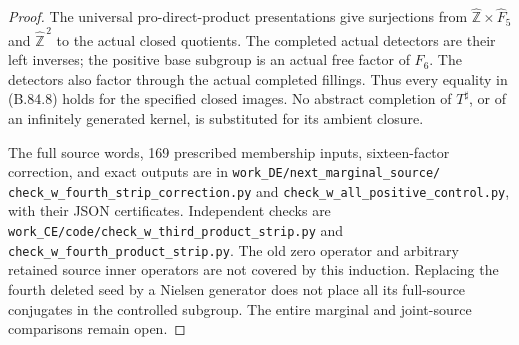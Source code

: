 \begin{proof}
The universal pro-direct-product presentations give surjections from
\(\widehat{\mathbb Z}\times\widehat F_5\) and
\(\widehat{\mathbb Z}^{\,2}\) to the actual closed quotients.
The completed actual detectors are their left inverses; the positive
base subgroup is an actual free factor of \(F_6\). The detectors
also factor through the actual completed fillings. Thus every equality
in (B.84.8) holds for the specified closed images. No abstract completion
of \(T^\sharp\), or of an infinitely generated kernel, is substituted
for its ambient closure.

The full source words, 169 prescribed membership inputs, sixteen-factor
correction, and exact outputs are in
\texttt{work\_\allowbreak DE/next\_\allowbreak marginal\_\allowbreak source/}\allowbreak
\texttt{check\_\allowbreak w\_\allowbreak fourth\_\allowbreak strip\_\allowbreak correction.py} and
\texttt{check\_\allowbreak w\_\allowbreak all\_\allowbreak positive\_\allowbreak control.py}, with their JSON
certificates. Independent checks are
\texttt{work\_\allowbreak CE/code/check\_\allowbreak w\_\allowbreak third\_\allowbreak product\_\allowbreak strip.py} and
\texttt{check\_\allowbreak w\_\allowbreak fourth\_\allowbreak product\_\allowbreak strip.py}.
The old zero operator and arbitrary retained source inner operators
are not covered by this induction. Replacing the fourth deleted seed
by a Nielsen generator does not place all its full-source conjugates
in the controlled subgroup. The entire marginal and joint-source
comparisons remain open.
\end{proof}
